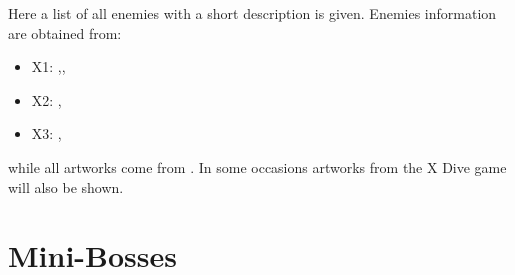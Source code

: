 Here a list of all enemies with a short description is given. Enemies information are obtained from: 
\begin{itemize}
	\item X1: \cite{wayback:X_resources},\cite{wiki:X1_enemies},
	\item X2: \cite{wayback:X2_resources},\cite{wiki:X2_enemies}
	\item X3: \cite{wayback:X3_resources},\cite{wiki:X3_enemies}
\end{itemize}
while all artworks come from \cite{book:MMX_Complete_art}. In some occasions artworks from the X Dive game will also  be shown.

\section{Mini-Bosses}
